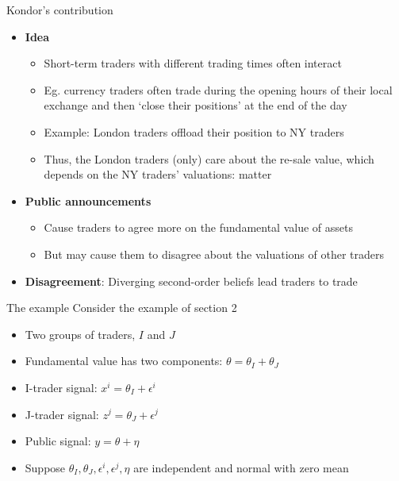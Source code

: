 \documentclass[english,10pt
,aspectratio=169
]{beamer}
\begin{document}
\begin{frame}{Kondor's contribution}
	\begin{itemize}
		\item \textbf{Idea} 
		\begin{itemize}
			\item Short-term traders with different trading times often interact
			\item Eg. currency traders often trade during the opening hours of their local exchange and then `close their positions' at the end of the day
			\item Example: London traders offload their position to NY traders 
			\item Thus, the London traders (only) care about the re-sale value, which depends on the NY traders' valuations:  matter
		\end{itemize}
		\item \textbf{Public announcements}
		\begin{itemize}
			\item Cause traders to agree more on the fundamental value of assets
			\item But may cause them to disagree about the valuations of other traders
		\end{itemize}
		\item \textbf{Disagreement}: Diverging second-order beliefs lead traders to trade
	\end{itemize}
\end{frame}


\begin{frame}{The example}
	Consider the example of section 2
	\begin{itemize}
		\item Two groups of traders, $I$ and $J$
		\item Fundamental value has two components: $\theta=\theta_{I}+\theta_{J}$
		\item I-trader signal: $x^{i} = \theta_{I}+\epsilon^{i}$
		\item J-trader signal: $z^{j} = \theta_{J}+\epsilon^{j}$
		\item Public signal: $y = \theta + \eta$
		\item Suppose $\theta_{I},\theta_{J}, \epsilon^{i}, \epsilon^{j}, \eta$ are independent and normal with zero mean
	\end{itemize}
\end{frame}
\end{document}
